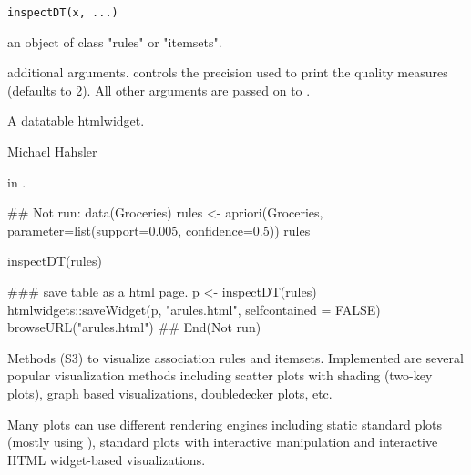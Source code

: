 \documentclass[letterpaper]{book}
\begin{document}
%
\begin{Usage}
\begin{verbatim}
inspectDT(x, ...) 
\end{verbatim}
\end{Usage}
%
\begin{Arguments}
\begin{ldescription}
\item[\code{x}]  an object of class "rules" or "itemsets". 
\item[\code{...}]  additional arguments.  controls the precision
used to print the quality measures (defaults to 2). All other arguments 
are passed on to .
\end{ldescription}
\end{Arguments}
%
\begin{Value}
A datatable htmlwidget.
\end{Value}
%
\begin{Author}\relax
Michael Hahsler
\end{Author}
%
\begin{SeeAlso}\relax
{} in .
\end{SeeAlso}
%
\begin{Examples}
\begin{ExampleCode}
## Not run: 
data(Groceries)
rules <- apriori(Groceries, parameter=list(support=0.005, confidence=0.5))
rules

inspectDT(rules)

### save table as a html page.
p <- inspectDT(rules)
htmlwidgets::saveWidget(p, "arules.html", selfcontained = FALSE)
browseURL("arules.html")
## End(Not run)
\end{ExampleCode}
\end{Examples}
%
\begin{Description}\relax
Methods (S3) to visualize association rules and itemsets.
Implemented are several popular visualization methods 
including scatter plots with shading (two-key plots), 
graph based visualizations, doubledecker plots, etc.

Many plots can use different rendering engines including
static standard plots (mostly using ), 
standard plots with interactive manipulation 
and interactive HTML widget-based visualizations.
\end{Description}
\end{document}

